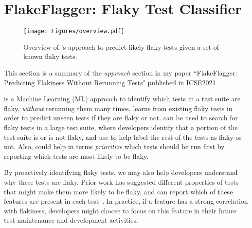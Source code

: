 \section{FlakeFlagger: Flaky Test Classifier}
\label{sec:flakeFlaggerClassifier}

% 

\begin{figure*}[t]
  \texttt{[image: Figures/overview.pdf]}
  \centering
  \vspace{-5pt}
  \caption{Overview of \sysName's approach to predict likely flaky tests given a set of known flaky tests.}
  \vspace{-15pt}
  \label{over_all_graph}
\end{figure*}
\vspace{-5pt}

This section is a summary of the \emph{approach} section in my paper ``FlakeFlagger: Predicting Flakiness Without Rerunning Tests" published in ICSE2021 \cite{alshammari2021flakeflagger}.

\sysName is a Machine Learning (ML) approach to identify which tests in a test suite are flaky, \emph{without} rerunning them many times. \sysName learns from existing flaky tests in order to predict unseen tests if they are flaky or not. \sysName can be used to search for flaky tests in a large test suite, where developers identify that a portion of the test suite is or is not flaky, and use \sysName to help label the rest of the tests as flaky or not. Also, \sysName could help in terms \emph{prioritize} which tests should be run first by reporting which tests are most likely to be flaky. 


By proactively identifying flaky tests, we may also help developers understand why these tests are flaky.
Prior work has suggested different properties of tests that might make them more likely to be flaky, and \sysName can report which of these features are present in each test~\cite{eck2019understanding,ahmad2021empirical}.
In practice, if a feature has a strong correlation with flakiness, developers might choose to focus on this feature in their future test maintenance and development activities. 





